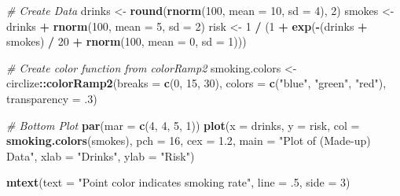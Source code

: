 \documentclass[]{book}
\newenvironment{Shaded}{\begin{snugshade}}{\end{snugshade}}
\newcommand{\KeywordTok}[1]{\textcolor[rgb]{0.13,0.29,0.53}{\textbf{#1}}}
\newcommand{\DataTypeTok}[1]{\textcolor[rgb]{0.13,0.29,0.53}{#1}}
\newcommand{\DecValTok}[1]{\textcolor[rgb]{0.00,0.00,0.81}{#1}}
\newcommand{\FloatTok}[1]{\textcolor[rgb]{0.00,0.00,0.81}{#1}}
\newcommand{\StringTok}[1]{\textcolor[rgb]{0.31,0.60,0.02}{#1}}
\newcommand{\CommentTok}[1]{\textcolor[rgb]{0.56,0.35,0.01}{\textit{#1}}}
\newcommand{\OperatorTok}[1]{\textcolor[rgb]{0.81,0.36,0.00}{\textbf{#1}}}
\newcommand{\NormalTok}[1]{#1}
\theoremstyle{definition}
\theoremstyle{definition}
\theoremstyle{remark}
\begin{document}
\begin{Shaded}
\begin{Highlighting}[]
\CommentTok{# Create Data}
\NormalTok{drinks <-}\StringTok{ }\KeywordTok{round}\NormalTok{(}\KeywordTok{rnorm}\NormalTok{(}\DecValTok{100}\NormalTok{, }\DataTypeTok{mean =} \DecValTok{10}\NormalTok{, }\DataTypeTok{sd =} \DecValTok{4}\NormalTok{), }\DecValTok{2}\NormalTok{)}
\NormalTok{smokes <-}\StringTok{ }\NormalTok{drinks }\OperatorTok{+}\StringTok{ }\KeywordTok{rnorm}\NormalTok{(}\DecValTok{100}\NormalTok{, }\DataTypeTok{mean =} \DecValTok{5}\NormalTok{, }\DataTypeTok{sd =} \DecValTok{2}\NormalTok{)}
\NormalTok{risk <-}\StringTok{ }\DecValTok{1} \OperatorTok{/}\StringTok{ }\NormalTok{(}\DecValTok{1} \OperatorTok{+}\StringTok{ }\KeywordTok{exp}\NormalTok{(}\OperatorTok{-}\NormalTok{(drinks }\OperatorTok{+}\StringTok{ }\NormalTok{smokes) }\OperatorTok{/}\StringTok{ }\DecValTok{20} \OperatorTok{+}\StringTok{ }\KeywordTok{rnorm}\NormalTok{(}\DecValTok{100}\NormalTok{, }\DataTypeTok{mean =} \DecValTok{0}\NormalTok{, }\DataTypeTok{sd =} \DecValTok{1}\NormalTok{)))}

\CommentTok{# Create color function from colorRamp2}
\NormalTok{smoking.colors <-}\StringTok{ }\NormalTok{circlize}\OperatorTok{::}\KeywordTok{colorRamp2}\NormalTok{(}\DataTypeTok{breaks =} \KeywordTok{c}\NormalTok{(}\DecValTok{0}\NormalTok{, }\DecValTok{15}\NormalTok{, }\DecValTok{30}\NormalTok{),}
                  \DataTypeTok{colors =} \KeywordTok{c}\NormalTok{(}\StringTok{"blue"}\NormalTok{, }\StringTok{"green"}\NormalTok{, }\StringTok{"red"}\NormalTok{),}
                  \DataTypeTok{transparency =}\NormalTok{ .}\DecValTok{3}\NormalTok{)}

\CommentTok{# Bottom Plot}
\KeywordTok{par}\NormalTok{(}\DataTypeTok{mar =} \KeywordTok{c}\NormalTok{(}\DecValTok{4}\NormalTok{, }\DecValTok{4}\NormalTok{, }\DecValTok{5}\NormalTok{, }\DecValTok{1}\NormalTok{))}
\KeywordTok{plot}\NormalTok{(}\DataTypeTok{x =}\NormalTok{ drinks, }
     \DataTypeTok{y =}\NormalTok{ risk, }
     \DataTypeTok{col =} \KeywordTok{smoking.colors}\NormalTok{(smokes),}
     \DataTypeTok{pch =} \DecValTok{16}\NormalTok{, }\DataTypeTok{cex =} \FloatTok{1.2}\NormalTok{, }\DataTypeTok{main =} \StringTok{"Plot of (Made-up) Data"}\NormalTok{,}
     \DataTypeTok{xlab =} \StringTok{"Drinks"}\NormalTok{, }\DataTypeTok{ylab =} \StringTok{"Risk"}\NormalTok{)}

\KeywordTok{mtext}\NormalTok{(}\DataTypeTok{text =} \StringTok{"Point color indicates smoking rate"}\NormalTok{, }\DataTypeTok{line =}\NormalTok{ .}\DecValTok{5}\NormalTok{, }\DataTypeTok{side =} \DecValTok{3}\NormalTok{)}
\end{Highlighting}
\end{Shaded}
\end{document}

